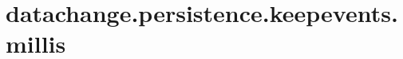 \section{datachange.persistence.keepevents.millis}
\label{configuration:DatachangePersistenceKeepeventsMillis}
\AvailableInJavaOnly{\TODO}